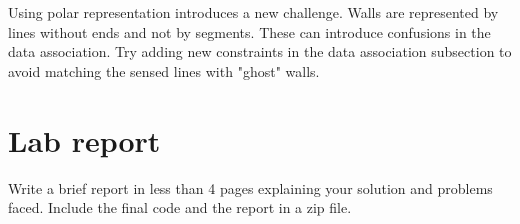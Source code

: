 \documentclass[a4paper,10pt]{article}
\begin{document}
Using polar representation introduces a new challenge. Walls are represented by lines without ends and not by segments. These can introduce confusions in the data association. Try adding new constraints in the data association subsection to avoid matching the sensed lines with "ghost" walls.

\section{Lab report}

Write a brief report in less than 4 pages explaining your solution and problems faced. Include the final code and the report in a zip file.
\end{document}
